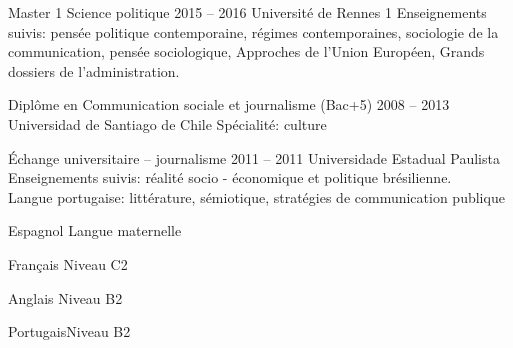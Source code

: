 \documentclass[30pt, french]{tccv}
\begin{document}
\begin{upshape}
%
%




\begin{education}

\vspace{0.5cm}
\item[Master 1 Science politique]{2015 -- 2016}
     {Université de Rennes 1}
     {Enseignements suivis: pensée politique contemporaine, 
     régimes contemporaines, sociologie de la communication, pensée sociologique, 
     Appro\-ches de l'Union Européen, Grands dossiers de\- l'ad\-mi\-ni\-stra\-tion.}



\vspace{0.5cm}
\item[Diplôme en Communication sociale et journalisme (Bac+5)]{2008 -- 2013}
     {Universidad de Santiago de Chile}
     {Spécialité: culture 
     }

 \vspace{0.5cm}    
\item[Échange universitaire -- journalisme]{2011 -- 2011}
     {Universidade Estadual Pau\-li\-sta}
     {Enseignements suivis: réalité socio - é\-co\-no\-mi\-que et politique brésilienne. \\
     Langue portugaise: littérature, sémiotique, stra\-té\-gies de communication publique}


\end{education}


%
%


\begin{competence}

\begin{factlist}
\item{Espagnol} {Langue maternelle}	
\item{Français} {Niveau C2}	
\item{Anglais}  {Niveau B2}	
\item{Portugais}{Niveau B2}
\end{factlist}


\end{competence}
\end{upshape}
\end{document}
